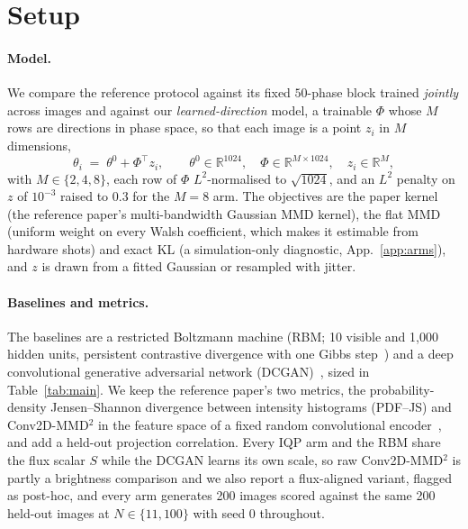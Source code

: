 \documentclass{article}
\begin{document}
\section{Setup}
\label{sec:setup}

\paragraph{Model.}
We compare the reference protocol against its fixed $50$-phase block trained \emph{jointly} across
images and against our \emph{learned-direction} model, a trainable $\Phi$ whose $M$ rows are
directions in phase space, so that each image is a point $z_i$ in $M$ dimensions,
\begin{equation}
\theta_i \;=\; \theta^{0} + \Phi^{\!\top} z_i,
\qquad \theta^{0}\in\mathbb{R}^{1024},\quad
\Phi\in\mathbb{R}^{M\times 1024},\quad z_i \in \mathbb{R}^{M},
\label{eq:affine}
\end{equation}
with $M \in \{2,4,8\}$, each row of $\Phi$ $L^2$-normalised to $\sqrt{1024}$, and an $L^2$ penalty on
$z$ of $10^{-3}$ raised to $0.3$ for the $M{=}8$ arm. The objectives are the paper kernel (the
reference paper's multi-bandwidth Gaussian MMD kernel), the flat MMD (uniform weight on every Walsh
coefficient, which makes it estimable from hardware shots) and exact KL (a simulation-only
diagnostic, App.~\ref{app:arms}), and $z$ is drawn from a fitted Gaussian or resampled with jitter.

\paragraph{Baselines and metrics.}
The baselines are a restricted Boltzmann machine (RBM; 10 visible and 1{,}000 hidden units,
persistent contrastive divergence with one Gibbs
step~\cite{hinton_2002_training,tieleman_2008_training}) and a deep convolutional generative
adversarial network (DCGAN)~\cite{radford_2015_unsupervised}, sized in Table~\ref{tab:main}. We keep
the reference paper's two metrics, the probability-density Jensen--Shannon divergence between
intensity histograms (PDF--JS) and Conv2D-MMD$^2$ in the feature space of a fixed random
convolutional encoder~\cite{gretton_2012_kernel}, and add a held-out projection correlation. Every
IQP arm and the RBM share the flux scalar $S$ while the DCGAN learns its own scale, so raw
Conv2D-MMD$^2$ is partly a brightness comparison and we also report a flux-aligned variant, flagged
as post-hoc, and every arm generates 200 images scored against
the same 200 held-out images at $N \in \{11,100\}$ with seed 0 throughout.
\end{document}
